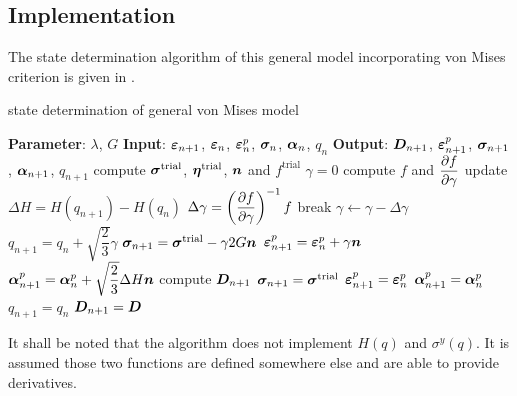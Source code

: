 \subsection{Implementation}
The state determination algorithm of this general model incorporating von Mises criterion is given in .
\begin{breakablealgorithm}
\caption{state determination of general von Mises model}\label{algo:j2_model}
\begin{algorithmic}
\State \textbf{Parameter}: $\lambda$, $G$
\State \textbf{Input}: $\bm{\varepsilon}_{n+1}$, $\bm{\varepsilon}_n$, $\bm{\varepsilon}^p_n$, $\bm{\sigma}_n$, $\bm{\alpha}_n$, $q_n$
\State \textbf{Output}: $\bm{D}_{n+1}$, $\bm{\varepsilon}^p_{n+1}$, $\bm{\sigma}_{n+1}$, $\bm{\alpha}_{n+1}$, $q_{n+1}$
\State compute $\bm{\sigma}^\text{trial}$, $\bm{\eta}^\text{trial}$, $\bm{n}$ and $f^\text{trial}$
\State $\gamma=0$
\State compute $f$ and $\dfrac{\partial{f}}{\partial{\gamma}}$
\State update $\Delta{}H=H\left(q_{n+1}\right)-H\left(q_n\right)$
\State $\Delta\gamma=\left(\dfrac{\partial{f}}{\partial{\gamma}}\right)^{-1}f$
\State break
\EndIf
\State $\gamma\leftarrow\gamma-\Delta\gamma$
\State $q_{n+1}=q_n+\sqrt{\dfrac{2}{3}}\gamma$
\EndWhile
\State $\bm{\sigma}_{n+1}=\bm{\sigma}^\text{trial}-\gamma2G\bm{n}$
\State $\bm{\varepsilon}^p_{n+1}=\bm{\varepsilon}^p_n+\gamma\bm{n}$
\State $\bm{\alpha}^p_{n+1}=\bm{\alpha}^p_n+\sqrt{\dfrac{2}{3}}\Delta{}H\bm{n}$
\State compute $\bm{D}_{n+1}$
\Else
\State $\bm{\sigma}_{n+1}=\bm{\sigma}^\text{trial}$
\State $\bm{\varepsilon}^p_{n+1}=\bm{\varepsilon}^p_n$
\State $\bm{\alpha}^p_{n+1}=\bm{\alpha}^p_n$
\State $q_{n+1}=q_n$
\State $\bm{D}_{n+1}=\bm{D}$
\EndIf
\end{algorithmic}
\end{breakablealgorithm}
It shall be noted that the algorithm does not implement $H\left(q\right)$ and $\sigma^y\left(q\right)$. It is assumed those two functions are defined somewhere else and are able to provide derivatives.
